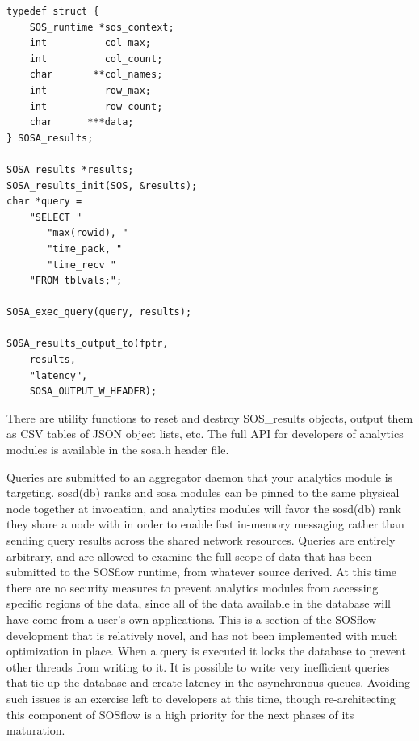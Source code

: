 \begin{lstlisting}[frame=single, basicstyle=\small]
typedef struct {
    SOS_runtime *sos_context;
    int          col_max;
    int          col_count;
    char       **col_names;
    int          row_max;
    int          row_count;
    char      ***data;
} SOSA_results;

SOSA_results *results;                                                                                                                       
SOSA_results_init(SOS, &results);
char *query =
    "SELECT "
       "max(rowid), "
       "time_pack, "
       "time_recv "
    "FROM tblvals;";

SOSA_exec_query(query, results);

SOSA_results_output_to(fptr,
    results,
    "latency",
    SOSA_OUTPUT_W_HEADER);
\end{lstlisting}

There are utility functions to reset and destroy SOS\_results objects,
output them as CSV tables of JSON object lists, etc.
%
The full API for developers of analytics modules is available in the
sosa.h header file.

Queries are submitted to an aggregator daemon that your analytics
module is targeting.
%
sosd(db) ranks and sosa modules can be pinned to the same physical
node together at invocation, and analytics modules will favor the
sosd(db) rank they share a node with in order to enable fast in-memory
messaging rather than sending query results across the shared network
resources.
%
Queries are entirely arbitrary, and are allowed to examine the full
scope of data that has been submitted to the SOSflow runtime, from
whatever source derived.
%
At this time there are no security measures to prevent analytics
modules from accessing specific regions of the data, since all of the
data available in the database will have come from a user's own
applications.
%
This is a section of the SOSflow development that is relatively novel,
and has not been implemented with much optimization in place.
%
When a query is executed it locks the database to prevent other
threads from writing to it.
%
It is possible to write very inefficient queries that tie up the
database and create latency in the asynchronous queues.
%
Avoiding such issues is an exercise left to developers at this time,
though re-architecting this component of SOSflow is a high priority
for the next phases of its maturation.

